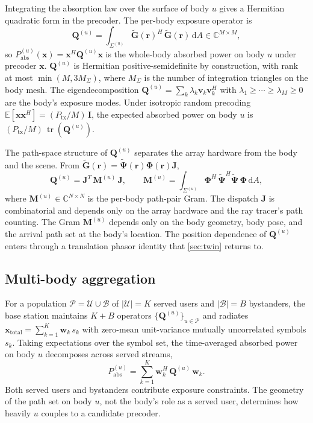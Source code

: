 \documentclass[journal,twocolumn,10pt]{IEEEtran}
\theoremstyle{plain}
\theoremstyle{remark}
\newcommand{\rr}{\mathbf{r}}
\newcommand{\xx}{\mathbf{x}}
\newcommand{\ww}{\mathbf{w}}
\newcommand{\Pabs}{P_{\mathrm{abs}}}
\newcommand{\Gtil}{\tilde{\mathbf{G}}}
\newcommand{\Qmat}{\mathbf{Q}}
\newcommand{\Mmat}{\mathbf{M}}
\newcommand{\Jmat}{\mathbf{J}}
\newcommand{\Phimat}{\mathbf{\Phi}}
\newcommand{\Psitil}{\tilde{\bm{\Psi}}}
\newcommand{\diff}{\mathrm{d}}
\newcommand{\Complex}{\mathbb{C}}
\newcommand{\AllBodies}{\mathcal{P}}
\newcommand{\Served}{\mathcal{U}}
\newcommand{\Bystanders}{\mathcal{B}}
\DeclareMathOperator{\tr}{tr}
\begin{document}
Integrating the absorption law over the surface of body $u$ gives a
Hermitian quadratic form in the precoder. The per-body exposure
operator is
\begin{equation}\label{eq:Q-def}
  \Qmat^{(u)} = \int_{\Sigma^{(u)}} \Gtil(\rr)^H\,\Gtil(\rr)\,\diff A
  \in \Complex^{M \times M},
\end{equation}
so $\Pabs^{(u)}(\xx) = \xx^H \Qmat^{(u)} \xx$ is the whole-body
absorbed power on body $u$ under precoder $\xx$. $\Qmat^{(u)}$ is
Hermitian positive-semidefinite by construction, with rank at most
$\min(M, 3 M_\Sigma)$, where $M_\Sigma$ is the number of integration
triangles on the body mesh. The eigendecomposition
$\Qmat^{(u)} = \sum_k \lambda_k \mathbf{v}_k \mathbf{v}_k^H$ with
$\lambda_1 \geq \cdots \geq \lambda_M \geq 0$ are the body's exposure
modes. Under isotropic random precoding
$\mathbb{E}[\xx\xx^H] = (P_{\mathrm{tx}}/M)\,\mathbf{I}$, the
expected absorbed power on body $u$ is
$(P_{\mathrm{tx}}/M)\,\tr(\Qmat^{(u)})$.

The path-space structure of $\Qmat^{(u)}$ separates the array
hardware from the body and the scene. From
$\Gtil(\rr) = \Psitil(\rr) \Phimat(\rr) \Jmat$,
\begin{equation}\label{eq:Q-factor}
  \Qmat^{(u)} = \Jmat^T\,\Mmat^{(u)}\,\Jmat,
  \qquad
  \Mmat^{(u)} = \int_{\Sigma^{(u)}}
  \Phimat^H\,\Psitil^H \Psitil\,\Phimat\,\diff A,
\end{equation}
where $\Mmat^{(u)} \in \Complex^{N \times N}$ is the per-body
path-pair Gram. The dispatch $\Jmat$ is combinatorial and depends
only on the array hardware and the ray tracer's path counting. The
Gram $\Mmat^{(u)}$ depends only on the body geometry, body pose, and
the arrival path set at the body's location. The position dependence
of $\Qmat^{(u)}$ enters through a translation phasor identity that
\cref{sec:twin} returns to.

\subsection{Multi-body aggregation}\label{sec:aggregation}

For a population $\AllBodies = \Served \cup \Bystanders$ of
$|\Served| = K$ served users and $|\Bystanders| = B$ bystanders, the
base station maintains $K + B$ operators
$\{\Qmat^{(u)}\}_{u \in \AllBodies}$ and radiates
$\xx_{\mathrm{total}} = \sum_{k=1}^K \ww_k\,s_k$ with zero-mean
unit-variance mutually uncorrelated symbols $s_k$. Taking
expectations over the symbol set, the time-averaged absorbed power
on body $u$ decomposes across served streams,
\begin{equation}\label{eq:Pabs-MU}
  \Pabs^{(u)} = \sum_{k=1}^K \ww_k^H\,\Qmat^{(u)}\,\ww_k.
\end{equation}
Both served users and bystanders contribute exposure constraints. The
geometry of the path set on body $u$, not the body's role as a
served user, determines how heavily $u$ couples to a candidate
precoder.
\end{document}
